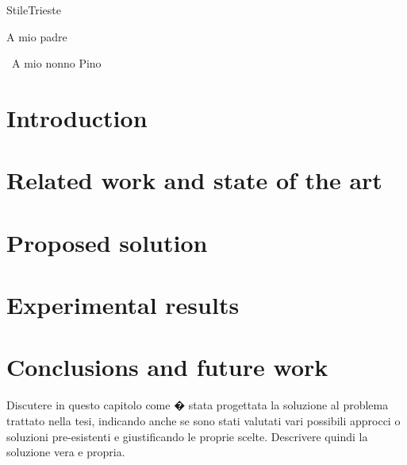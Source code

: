 \documentclass[pdfa%
,cucitura%
]{toptesi}
\begin{document}

\expandafter\ifx\csname StileTrieste\endcsname\relax
    \frontespizio
\else
    \paginavuota
    \begin{dedica}
        A mio padre

        \textdagger\ A mio nonno Pino
    \end{dedica}
    \tomo
\fi








\indici

\mainmatter

\chapter{Introduction}

%

\chapter{Related work and state of the art}


\chapter{Proposed solution}


\chapter{Experimental results}


\chapter{Conclusions and future work}




Discutere in questo capitolo come � stata progettata la soluzione al problema trattato nella tesi, indicando anche se sono stati valutati vari possibili approcci o soluzioni pre-esistenti e giustificando le proprie scelte. Descrivere quindi la soluzione vera e propria.
\end{document}
